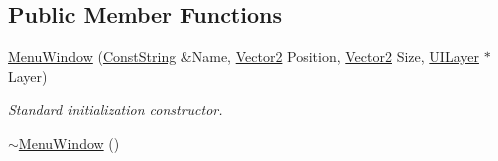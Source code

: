 \subsection*{Public Member Functions}
\begin{DoxyCompactItemize}
\item 
\hyperlink{classphys_1_1UI_1_1MenuWindow_a673f9fb0961f37d7471a9916fff58c60}{MenuWindow} (\hyperlink{namespacephys_a5ce5049f8b4bf88d6413c47b504ebb31}{ConstString} \&Name, \hyperlink{classphys_1_1Vector2}{Vector2} Position, \hyperlink{classphys_1_1Vector2}{Vector2} Size, \hyperlink{classphys_1_1UILayer}{UILayer} $\ast$Layer)
\begin{DoxyCompactList}\small\item\em Standard initialization constructor. \item\end{DoxyCompactList}\item 
\hypertarget{classphys_1_1UI_1_1MenuWindow_a8de1eab7a7897e24dfb722cce7d903eb}{
\hyperlink{classphys_1_1UI_1_1MenuWindow_a8de1eab7a7897e24dfb722cce7d903eb}{$\sim$MenuWindow} ()}
\label{d4/d07/classphys_1_1UI_1_1MenuWindow_a8de1eab7a7897e24dfb722cce7d903eb}


\end{DoxyCompactItemize}

